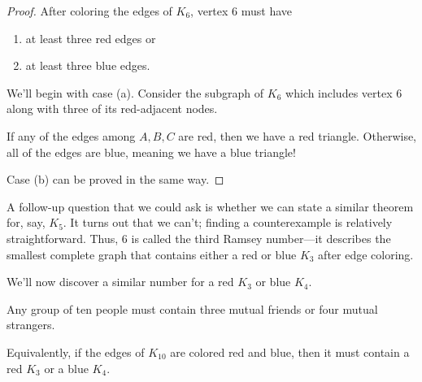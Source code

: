 \documentclass[../m055main.tex]{subfiles}
\begin{document}
\begin{proof}
    After coloring the edges of $K_6$, vertex 6 must have
    \begin{enumerate}[label=(\alph*)]
        \item at least three red edges or
        \item at least three blue edges.
    \end{enumerate}
    We'll begin with case (a).
    Consider the subgraph of $K_6$ which includes vertex 6 along with three of its red-adjacent nodes.

    \begin{center}
    \end{center}

    If any of the edges among $A,B,C$ are red, then we have a red triangle.
    Otherwise, all of the edges are blue, meaning we have a blue triangle!

    Case (b) can be proved in the same way.
\end{proof}

A follow-up question that we could ask is whether we can state a similar theorem for, say, $K_5$.
It turns out that we can't; finding a counterexample is relatively straightforward.
Thus, 6 is called the third Ramsey number---it describes the smallest complete graph that contains either a red or blue $K_3$ after edge coloring.

We'll now discover a similar number for a red $K_3$ or blue $K_4$.

\begin{corollary}
    Any group of ten people must contain three mutual friends or four mutual strangers.

    Equivalently, if the edges of $K_{10}$ are colored red and blue, then it must contain a red $K_3$ or a blue $K_4$.
\end{corollary}
\end{document}
